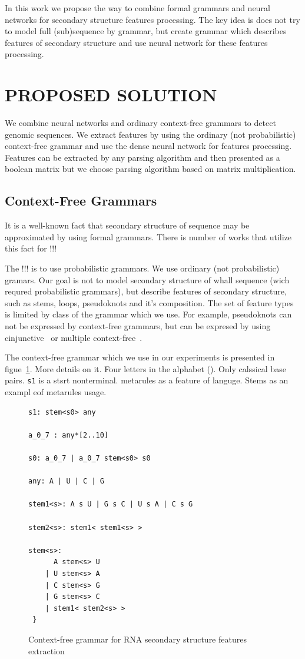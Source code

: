 \documentclass[a4paper,twoside]{article}
\begin{document}
In this work we propose the way to combine formal grammars and neural networks for secondary structure features processing.
The key idea is does not try to model full (sub)sequence by grammar, but create grammar which describes features of secondary structure and use neural network for these features processing.

\section{\uppercase{Proposed solution}}
\label{sec:proposedSolution}

\noindent We combine neural networks and ordinary context-free grammars to detect genomic sequences. 
We extract features by using the ordinary (not probabilistic) context-free grammar and use the dense neural network for features processing.
Features can be extracted by any parsing algorithm and then presented as a boolean matrix but we choose parsing algorithm based on matrix multiplication.

\subsection{Context-Free Grammars}

\noindent It is a well-known fact that secondary structure of sequence may be approximated by using formal grammars.
There is number of works that utilize this fact for !!!

The !!! is to use probabilistic grammars.
We use ordinary (not probabilistic) gramars.
Our goal is not to model secondary structure of whall sequence (wich requred probabilistic grammars), but describe features of secondary structure, such as stems, loops, pseudoknots and it's composition.
The set of feature types is limited by class of the grammar which we use.
For example, pseudoknots can not be expressed by context-free grammars, but can be expresed by using cinjunctive~\cite{KanchanDevi2017,zier2013rna,Okhotin:2001:CG:543313.543323} or multiple context-free~\cite{SEKI1991191,Riechert:2016:ADP:2972703.2972851}.

The context-free grammar which we use in our experiments is presented in figue~\ref{fig:cfg-rna}.
More details on it.
Four letters in the alphabet ().
Only calssical base pairs.
\verb|s1| is a stsrt nonterminal.
metarules as a feature of languge.
Stems as an exampl eof metarules usage.

\begin{figure}
\begin{verbatim}
s1: stem<s0> any

a_0_7 : any*[2..10]

s0: a_0_7 | a_0_7 stem<s0> s0

any: A | U | C | G

stem1<s>: A s U | G s C | U s A | C s G 

stem2<s>: stem1< stem1<s> >

stem<s>:  
      A stem<s> U 
    | U stem<s> A 
    | C stem<s> G 
    | G stem<s> C 
    | stem1< stem2<s> >  
 } 
\end{verbatim}
\caption{Context-free grammar for RNA secondary structure features extraction}
\label{fig:cfg-rna}
\end{figure}
\end{document}
